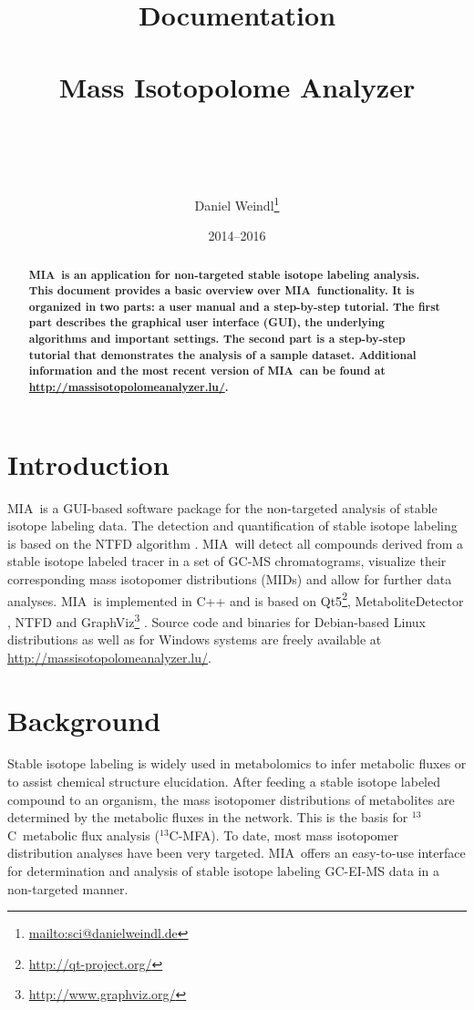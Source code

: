 \documentclass[a4paper,12pt]{scrartcl}
\title{{\large Documentation}\\\app\\{\Large Mass Isotopolome Analyzer}\\ \ \\\small\gitAbbrevHash\\ \gitCommitterIsoDate}
\author{\small Daniel Weindl\footnote{\url{mailto:sci@danielweindl.de}}}
\date{\small 2014--2016}
\newcommand*\CC{$^{13}$C}
\newcommand*\app{\textsc{MIA}}
\begin{document}
\maketitle
 
\begin{abstract}
\textbf{\app\ is an application for non-targeted stable isotope labeling analysis. This document provides a basic overview over \app\ functionality. It is organized in two parts: a user manual and a step-by-step tutorial. The first part describes the graphical user interface (GUI), the underlying algorithms and important settings. The second part is a step-by-step tutorial that demonstrates the analysis of a sample dataset.
\newline
Additional information and the most recent version of \app\ can be found at \url{http://massisotopolomeanalyzer.lu/}.
}
\end{abstract}

\newpage\tableofcontents\newpage

\section{Introduction}

\app\ is a GUI-based software package for the non-targeted analysis of stable isotope labeling data. %
The detection and quantification of stable isotope labeling is based on the NTFD algorithm \citep{Hiller2010,Weindl2015a}. \app\ will detect all compounds derived from a stable isotope labeled tracer in a set of GC-MS chromatograms, visualize their corresponding mass isotopomer distributions (MIDs) and allow for further data analyses. \app\ is implemented in C++ and is based on Qt5\footnote{\url{http://qt-project.org/}}, MetaboliteDetector \cite{Hiller2009}, NTFD \cite{Hiller2010} and GraphViz\footnote{\url{http://www.graphviz.org/}} \cite{Gansner2000}. Source code and binaries for Debian-based Linux distributions as well as for Windows systems are freely available at \url{http://massisotopolomeanalyzer.lu/}.


\section{Background}
\label{sec:background}

Stable isotope labeling is widely used in metabolomics to infer metabolic fluxes or to assist chemical structure elucidation. After feeding a stable isotope labeled compound to an organism, the mass isotopomer distributions of metabolites are determined by the metabolic fluxes in the network. This is the basis for \CC\ metabolic flux analysis (\CC-MFA). To date, most mass isotopomer distribution analyses have been very targeted. \app\ offers an easy-to-use interface for determination and analysis of stable isotope labeling GC-EI-MS data in a non-targeted manner.
\end{document}
